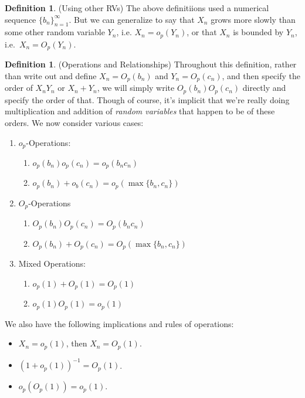 \documentclass[12pt]{article}
\theoremstyle{plain}
\theoremstyle{definition}
\newtheorem{defn}[thm]{Definition}
\theoremstyle{remark}
\newcommand{\ninf}{_{n=1}^\infty}
\begin{document}
\begin{defn}(Using other RVs)
The above definitiions used a numerical sequence $\{b_n\}\ninf$.
But we can generalize to say that $X_n$ grows more slowly than some
other random variable $Y_n$, i.e. $X_n = o_p(Y_n)$, or that $X_n$ is
bounded by $Y_n$, i.e.\ $X_n=O_p(Y_n)$.
\end{defn}

\clearpage
\begin{defn}(Operations and Relationships)
Throughout this definition, rather than write out and define $X_n =
O_p(b_n)$ and $Y_n=O_p(c_n)$, and then specify the order of $X_nY_n$ or
$X_n+Y_n$, we will simply write $O_p(b_n)O_p(c_n)$ directly and specify
the order of that. Though of course, it's implicit that we're really
doing multiplication and addition of \emph{random variables} that
happen to be of these orders. We now consider various cases:
\begin{enumerate}
  \item $o_p$-Operations:
    \begin{enumerate}
      \item $o_p(b_n)o_p(c_n)=o_p(b_nc_n)$
      \item $o_p(b_n)+o_b(c_n) = o_p(\max\{b_n, c_n\})$
    \end{enumerate}

  \item $O_p$-Operations
    \begin{enumerate}
      \item $O_p(b_n)O_p(c_n)=O_p(b_nc_n)$
      \item $O_p(b_n)+O_p(c_n) = O_p(\max\{b_n, c_n\})$
    \end{enumerate}

  \item Mixed Operations:
    \begin{enumerate}
      \item $o_p(1)+O_p(1) = O_p(1)$
      \item $o_p(1)O_p(1)=o_p(1)$
    \end{enumerate}
\end{enumerate}
We also have the following implications and rules of operations:
\begin{itemize}
  \item $X_n=o_p(1)$, then $X_n=O_p(1)$.
  \item $(1+o_p(1))^{-1}=O_p(1)$.
  \item $o_p(O_p(1))=o_p(1)$.
\end{itemize}
\end{defn}
\end{document}
